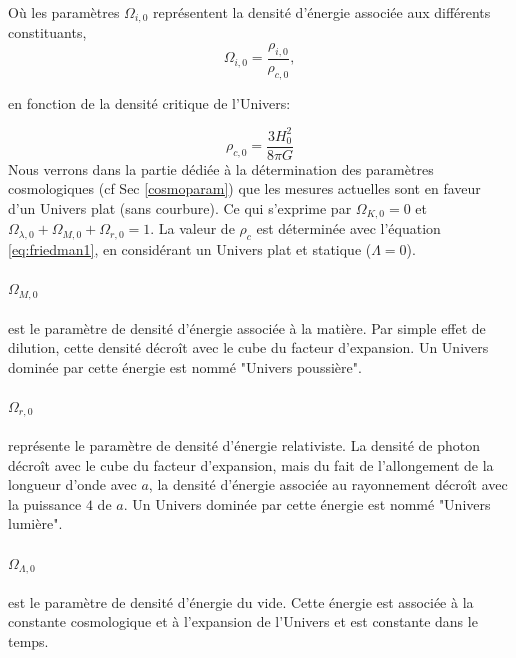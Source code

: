 Où les paramètres $\Omega_{i,0}$ représentent la densité d'énergie associée aux différents constituants, 
\begin{equation}
 \Omega_{i,0} = \frac{\rho_{i,0}}{\rho_{c,0}},
 \end{equation}

en fonction de la densité critique de l'Univers:

\begin{equation}
\rho_{c,0} = \frac{3H_0^2}{8\pi G}
 \end{equation}
Nous verrons dans la partie dédiée à la détermination des paramètres cosmologiques (cf Sec \ref{cosmoparam}) que les mesures actuelles sont en faveur d'un Univers plat (sans courbure).
Ce qui s'exprime par $\Omega_{K,0} = 0$ et $\Omega_{\lambda,0} +  \Omega_{M,0} + \Omega_{r,0} =1$.
La valeur de $\rho_c$ est déterminée avec l'équation \ref{eq:friedman1}, en considérant un Univers plat et statique ($\Lambda=0$).

\paragraph{$\Omega_{M,0}$} est le paramètre de densité d'énergie associée à la matière. %
Par simple effet de dilution, cette densité décroît avec le cube du facteur d'expansion.
Un Univers dominée par cette énergie est nommé "Univers poussière".

\paragraph{$\Omega_{r,0}$} représente le paramètre de densité d'énergie relativiste.
La densité de photon décroît avec le cube du facteur d'expansion, mais du fait de l'allongement de la longueur d'onde avec $a$, la densité d'énergie associée au rayonnement décroît avec la puissance $4$ de $a$.
Un Univers dominée par cette énergie est nommé "Univers lumière".

\paragraph{$\Omega_{\Lambda,0}$} est le paramètre de densité d’énergie du vide.
Cette énergie est associée à la constante cosmologique et à l'expansion de l'Univers et est constante dans le temps.

